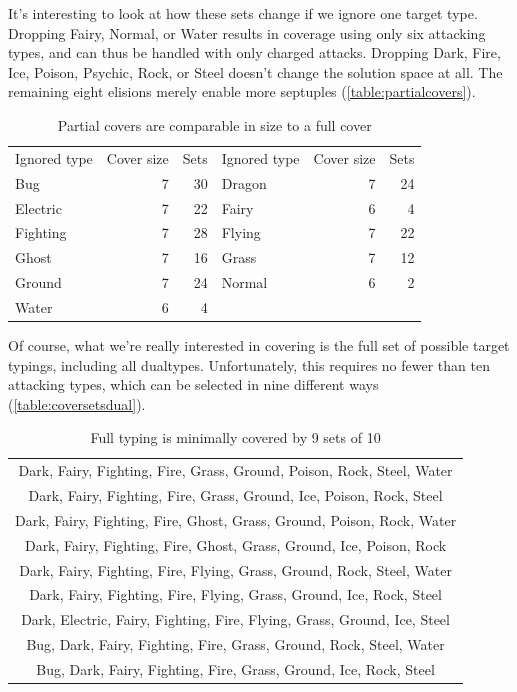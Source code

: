 It's interesting to look at how these sets change if we ignore one target type.
Dropping Fairy, Normal, or Water results in coverage using only six attacking types,
  and can thus be handled with only charged attacks.
Dropping Dark, Fire, Ice, Poison, Psychic, Rock, or Steel doesn't change the solution space at all.
The remaining eight elisions merely enable more septuples (\autoref{table:partialcovers}).
\begin{table}
\centering
  \begin{tabular}{lrr|lrr}
    Ignored type & Cover size & Sets & Ignored type & Cover size & Sets\\
    \Midrule
    Bug & 7 & 30 & Dragon & 7 & 24\\
    Electric & 7 & 22 & Fairy & 6 & 4\\
    Fighting & 7 & 28 & Flying & 7 & 22\\
    Ghost & 7 & 16 & Grass & 7 & 12\\
    Ground & 7 & 24 & Normal & 6 & 2\\
    Water & 6 & 4 & & & \\
  \end{tabular}
  \caption{Partial covers are comparable in size to a full cover\label{table:partialcovers}}
\end{table}

Of course, what we're really interested in covering is the full set
  of possible target typings, including all dualtypes.
Unfortunately, this requires no fewer than ten attacking types,
  which can be selected in nine different ways (\autoref{table:coversetsdual}).
\begin{table}
  \centering
  \begin{tabular}{c}
 Dark, Fairy, Fighting, Fire, Grass, Ground, Poison, Rock, Steel, Water\\
 Dark, Fairy, Fighting, Fire, Grass, Ground, Ice, Poison, Rock, Steel\\
 Dark, Fairy, Fighting, Fire, Ghost, Grass, Ground, Poison, Rock, Water\\
 Dark, Fairy, Fighting, Fire, Ghost, Grass, Ground, Ice, Poison, Rock\\
 Dark, Fairy, Fighting, Fire, Flying, Grass, Ground, Rock, Steel, Water\\
 Dark, Fairy, Fighting, Fire, Flying, Grass, Ground, Ice, Rock, Steel\\
 Dark, Electric, Fairy, Fighting, Fire, Flying, Grass, Ground, Ice, Steel\\
 Bug, Dark, Fairy, Fighting, Fire, Grass, Ground, Rock, Steel, Water\\
 Bug, Dark, Fairy, Fighting, Fire, Grass, Ground, Ice, Rock, Steel\\
  \end{tabular}
  \caption{Full typing is minimally covered by 9 sets of 10\label{table:coversetsdual}}
\end{table}

